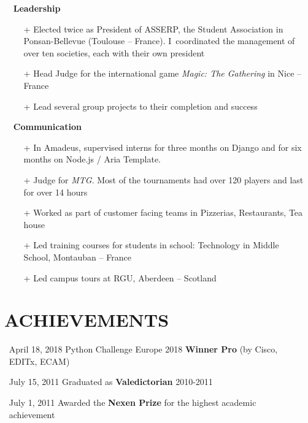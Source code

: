 \documentclass{res}
\begin{document}
\begin{resume}
    \begin{itemize}
        \item[] \faHandshake[regular]~\textbf{Leadership}
        \begin{itemize}
            \item[+] Elected twice as President of ASSERP, the Student Association in Ponsan-Bellevue (Toulouse -- France). I~coordinated the management of over ten societies, each with their own president
            \item[+] Head Judge for the international game \textit{Magic: The Gathering} in Nice -- France
            \item[+] Lead several group projects to their completion and success
        \end{itemize}
    \end{itemize}

    \begin{itemize}
        \item[] \faComments[regular]~\textbf{Communication}
        \begin{itemize}
            \item[+] In Amadeus, supervised interns for three months on Django and for six months on Node.js / Aria Template.
            \item[+] Judge for \textit{MTG}. Most of the tournaments had over 120 players and last for over 14 hours
            \item[+] Worked as part of customer facing teams in Pizzerias, Restaurants, Tea house
            \item[+] Led training courses for students in school: Technology in Middle School, Montauban -- France
            \item[+] Led campus tours at RGU, Aberdeen -- Scotland
        \end{itemize}
    \end{itemize}


\section{\faMedal~ACHIEVEMENTS}
    \begin{itemize}
        \item[] April 18, 2018 \tabto{4cm} Python Challenge Europe 2018 \textbf{Winner Pro} (by Cisco, EDITx, ECAM)
        \item[] July 15, 2011 \tabto{4cm} Graduated as \textbf{Valedictorian} 2010-2011
        \item[] July 1, 2011 \tabto{4cm} Awarded the \textbf{Nexen Prize} for the highest academic achievement
    \end{itemize}


\end{resume}
\end{document}
